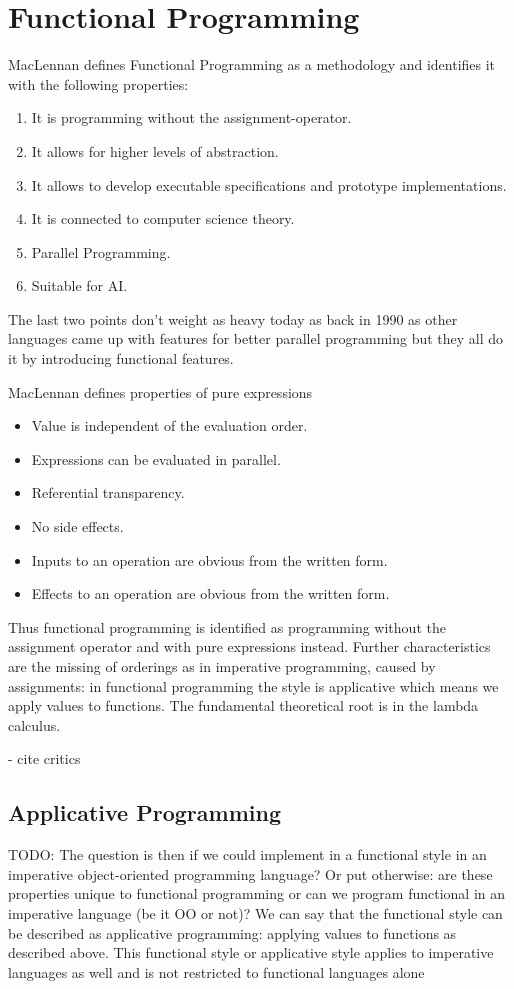 \chapter{Functional Programming}
MacLennan \cite{maclennan_functional_1990} defines Functional Programming as a methodology and identifies it with the following properties:

\begin{enumerate}
	\item It is programming without the assignment-operator.
	\item It allows for higher levels of abstraction.
	\item It allows to develop executable specifications and prototype implementations.
	\item It is connected to computer science theory.
	\item Parallel Programming.
	\item Suitable for AI.
\end{enumerate}

The last two points don't weight as heavy today as back in 1990 as other languages came up with features for better parallel programming but they all do it by introducing functional features.

MacLennan \cite{maclennan_functional_1990} defines properties of pure expressions 
\begin{itemize}
	\item Value is independent of the evaluation order.
	\item Expressions can be evaluated in parallel.
	\item Referential transparency.
	\item No side effects.
	\item Inputs to an operation are obvious from the written form.
	\item Effects to an operation are obvious from the written form.
\end{itemize}

Thus functional programming is identified as programming without the assignment operator and with pure expressions instead. Further characteristics are the missing of orderings as in imperative programming, caused by assignments: in functional programming the style is applicative which means we apply values to functions. The fundamental theoretical root is in the lambda calculus.

- cite critics

\section{Applicative Programming}
TODO: The question is then if we could implement in a functional style in an imperative object-oriented programming language? Or put otherwise: are these properties unique to functional programming or can we program functional in an imperative language (be it OO or not)? We can say that the functional style can be described as applicative programming: applying values to functions as described above. This functional style or applicative style applies to imperative languages as well and is not restricted to functional languages alone

